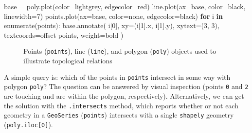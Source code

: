 \documentclass[
  letterpaper,
]{krantz}
\newenvironment{Shaded}{\begin{snugshade}}{\end{snugshade}}
\newcommand{\BuiltInTok}[1]{\textcolor[rgb]{0.00,0.23,0.31}{#1}}
\newcommand{\ControlFlowTok}[1]{\textcolor[rgb]{0.00,0.23,0.31}{\textbf{#1}}}
\newcommand{\DecValTok}[1]{\textcolor[rgb]{0.68,0.00,0.00}{#1}}
\newcommand{\KeywordTok}[1]{\textcolor[rgb]{0.00,0.23,0.31}{\textbf{#1}}}
\newcommand{\NormalTok}[1]{\textcolor[rgb]{0.00,0.23,0.31}{#1}}
\newcommand{\OperatorTok}[1]{\textcolor[rgb]{0.37,0.37,0.37}{#1}}
\newcommand{\StringTok}[1]{\textcolor[rgb]{0.13,0.47,0.30}{#1}}
\begin{document}
\begin{Shaded}
\begin{Highlighting}[]
\NormalTok{base }\OperatorTok{=}\NormalTok{ poly.plot(color}\OperatorTok{=}\StringTok{\textquotesingle{}lightgrey\textquotesingle{}}\NormalTok{, edgecolor}\OperatorTok{=}\StringTok{\textquotesingle{}red\textquotesingle{}}\NormalTok{)}
\NormalTok{line.plot(ax}\OperatorTok{=}\NormalTok{base, color}\OperatorTok{=}\StringTok{\textquotesingle{}black\textquotesingle{}}\NormalTok{, linewidth}\OperatorTok{=}\DecValTok{7}\NormalTok{)}
\NormalTok{points.plot(ax}\OperatorTok{=}\NormalTok{base, color}\OperatorTok{=}\StringTok{\textquotesingle{}none\textquotesingle{}}\NormalTok{, edgecolor}\OperatorTok{=}\StringTok{\textquotesingle{}black\textquotesingle{}}\NormalTok{)}
\ControlFlowTok{for}\NormalTok{ i }\KeywordTok{in} \BuiltInTok{enumerate}\NormalTok{(points):}
\NormalTok{    base.annotate(}
\NormalTok{        i[}\DecValTok{0}\NormalTok{], xy}\OperatorTok{=}\NormalTok{(i[}\DecValTok{1}\NormalTok{].x, i[}\DecValTok{1}\NormalTok{].y), }
\NormalTok{        xytext}\OperatorTok{=}\NormalTok{(}\DecValTok{3}\NormalTok{, }\DecValTok{3}\NormalTok{), textcoords}\OperatorTok{=}\StringTok{\textquotesingle{}offset points\textquotesingle{}}\NormalTok{, weight}\OperatorTok{=}\StringTok{\textquotesingle{}bold\textquotesingle{}}
\NormalTok{    )}
\end{Highlighting}
\end{Shaded}

\begin{figure}[H]


\caption{\label{fig-spatial-relations-geoms}Points (\texttt{points}),
line (\texttt{line}), and polygon (\texttt{poly}) objects used to
illustrate topological relations}

\end{figure}%

A simple query is: which of the points in \texttt{points} intersect in
some way with polygon \texttt{poly}? The question can be answered by
visual inspection (points \texttt{0} and \texttt{2} are touching and are
within the polygon, respectively). Alternatively, we can get the
solution with the \texttt{.intersects} method, which reports whether or
not each geometry in a \texttt{GeoSeries} (\texttt{points}) intersects
with a single \texttt{shapely} geometry (\texttt{poly.iloc{[}0{]}}).
\end{document}
